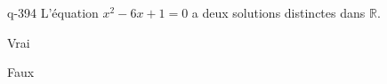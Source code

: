 \begin{truefalse}{q-394}
L'équation $x^2-6x+1=0$ a deux solutions distinctes dans $\mathbb R$.
\item* Vrai
\item Faux
\end{truefalse}

